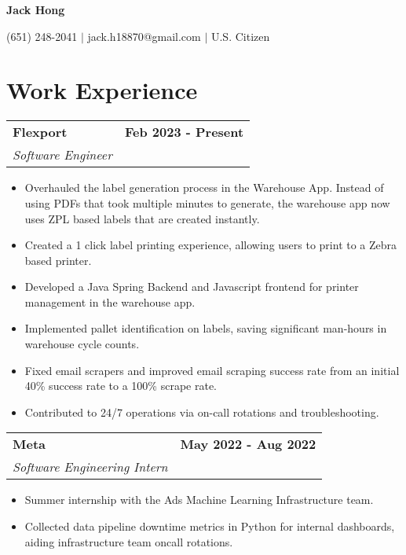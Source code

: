 \documentclass[11pt]{extreport}
\makeatletter
\newcommand{\resumeSubheading}[4]{
  \vspace{-1pt}
    \begin{tabular*}{1.0\textwidth}{l@{\extracolsep{\fill}}r}
      \textbf{#1} & \textbf{#2}  \vspace{1mm} \\
      {#3} & \textbf{#4} \\
    \end{tabular*}\vspace{-3pt}
}
\makeatother
\begin{document}
\vspace*{-40pt}
\begin{center}
	\textbf{{\LARGE Jack Hong}} \\
	      \vspace{2mm}

    (651) 248-2041 $|$ jack.h18870@gmail.com $|$ U.S. Citizen
\end{center}
\vspace{-4mm}

\section{Work Experience}
\resumeSubheading{Flexport}{Feb 2023 - Present}
    {\textit{Software Engineer}}{}
    \vspace{-3mm}
    \begin{itemize}
    \item[\textperiodcentered] Overhauled the label generation process in the Warehouse App. Instead of using PDFs that took multiple minutes to generate, the warehouse app now uses ZPL based labels that are created instantly.
    \item[\textperiodcentered] Created a 1 click label printing experience, allowing users to print to a Zebra based printer.
    \item[\textperiodcentered] Developed a Java Spring Backend and Javascript frontend for printer management in the warehouse app.
    \item[\textperiodcentered] Implemented pallet identification on labels, saving significant man-hours in warehouse cycle counts. 
        \item[\textperiodcentered] Fixed email scrapers and improved email scraping success rate from an initial 40\% success rate to a 100\% scrape rate.
    \item[\textperiodcentered] Contributed to 24/7 operations via on-call rotations and troubleshooting.

      \vspace{-1mm}
    \end{itemize}

\resumeSubheading{Meta}{May 2022 - Aug 2022}
    {\textit{Software Engineering Intern}}{}
    \vspace{-3mm}
    \begin{itemize}
    \item[\textperiodcentered] Summer internship with the Ads Machine Learning Infrastructure team.
    \vspace{-1mm}
     \item[\textperiodcentered] Collected data pipeline downtime metrics in Python for internal dashboards, aiding infrastructure team oncall rotations.
      \vspace{-1mm}
    \end{itemize}
    
\end{document}

